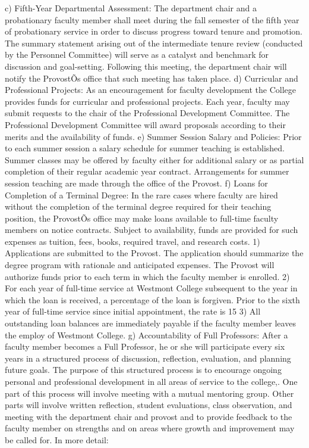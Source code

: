 \documentclass[letterpaper, 11pt]{article}
\begin{document}
	c) Fifth-Year Departmental Assessment:  The department chair and a probationary faculty member shall meet during the fall semester of the fifth year of probationary service in order to discuss progress toward tenure and promotion.  The summary statement arising out of the intermediate tenure review (conducted by the Personnel Committee) will serve as a catalyst and benchmark for discussion and goal-setting.  Following this meeting, the department chair will notify the ProvostÕs office that such meeting has taken place.
	d) Curricular and Professional Projects:  As an encouragement for faculty development the College provides funds for curricular and professional projects.  Each year, faculty may submit requests to the chair of the Professional Development Committee. The Professional Development Committee will award proposals according to their merits and the availability of funds.
	e) Summer Session Salary and Policies:  Prior to each summer session a salary schedule for summer teaching is established.  Summer classes may be offered by faculty either for additional salary or as partial completion of their regular academic year contract. Arrangements for summer session teaching are made through the office of the Provost.
	f) Loans for Completion of a Terminal Degree:  In the rare cases where faculty are hired without the completion of the terminal degree required for their teaching position, the ProvostÕs office may make loans available to full-time faculty members on notice contracts. Subject to availability, funds are provided for such expenses as tuition, fees, books, required travel, and research costs.
	1) Applications are submitted to the Provost.  The application should summarize the degree program with rationale and anticipated expenses.  The Provost will authorize funds prior to each term in which the faculty member is enrolled.
	2) For each year of full-time service at Westmont College subsequent to the year in which the loan is received, a percentage of the loan is forgiven.  Prior to the sixth year of full-time service since initial appointment, the rate is 15%
	3) All outstanding loan balances are immediately payable if the faculty member leaves the employ of Westmont College.
	g) Accountability of Full Professors:  After a faculty member becomes a Full Professor, he or she will participate every six years in a structured process of discussion, reflection, evaluation, and planning future goals. The purpose of this structured process is to encourage ongoing personal and professional development in all areas of service to the college,. One part of this process will involve meeting with a mutual mentoring group. Other parts will involve written reflection, student evaluations, class observation, and meeting with the department chair and provost and to provide feedback to the faculty member on strengths and on areas where growth and improvement may be called for. In more detail:
\end{document}
